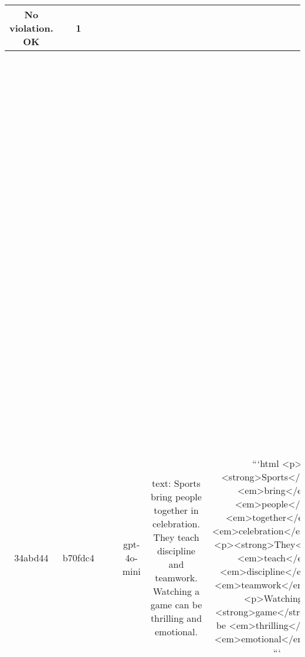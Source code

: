 \begin{table}[h!]
\begin{tabular}{|c|c|c|c|c|c|c|c|c|c|}
No violation.
OK & 1\\
\hline
34abd44 & b70fdc4 &  &  & gpt-4o-mini & text: Sports bring people together in celebration. They teach discipline and teamwork. Watching a game can be thrilling and emotional. & ```html
<p><strong>Sports</strong> <em>bring</em> <em>people</em> <em>together</em> in <em>celebration</em>.</p>
<p><strong>They</strong> <em>teach</em> <em>discipline</em> and <em>teamwork</em>.</p>
<p>Watching a <strong>game</strong> can be <em>thrilling</em> and <em>emotional</em>.</p>
``` & ok & The evaluation of the chatbot's output is as follows:

1. The output consists of three sentences, each wrapped in a `<p>` tag, which complies with the requirement to split the paragraph into individual sentences and wrap each in a `<p>` tag. This fulfills the description's requirement to have at least three `<p>` tags.

2. Each `<p>` tag contains one `<strong>` tag, which complies with the requirement to add one `<strong>` tag.

3. Multiple `<em>` tags are present in each `<p>` tag, emphasizing keywords or phrases, which complies with the requirement to add multiple `<em>` tags.

All elements adhere strictly to the description's requirements, and no rules are violated based on the provided output. 

OK & 1\\
\hline
121561c & b70fdc4 &  &  & gpt-4o-mini & text: Time management is essential for productivity. It helps in prioritizing tasks effectively. People achieve more when they plan their schedule wisely. & ```html
<p><strong>Time management</strong> is essential for <em>productivity</em>.</p>
<p>It helps in <strong>prioritizing</strong> tasks <em>effectively</em>.</p>
<p>People achieve more when they <strong>plan</strong> their <em>schedule</em> <em>wisely</em>.</p>
``` & ok & The chatbot description specifies that each sentence of a paragraph should be wrapped in a `<p>` tag. The output indeed has three `<p>` tags, each containing a single sentence, suggesting compliance with the requirement of having at least three `<p>` tags.

Within each sentence, the description asks for at least one `<strong>` tag and multiple `<em>` tags for emphasizing key words and phrases. Each `<p>` tag in the output contains one `<strong>` tag, which matches the requirement. There are also multiple `<em>` tags within the entire output: the first and third `<p>` tags each contain two `<em>` tags, while the second one has one `<em>` tag. While the requirement is phrased in such a way that it might imply multiple `<em>` tags per sentence, the description could also be interpreted as allowing one or more `<em>` tags per sentence due to the use of "multiple", which can include at least one.


\end{tabular}
\end{table}
